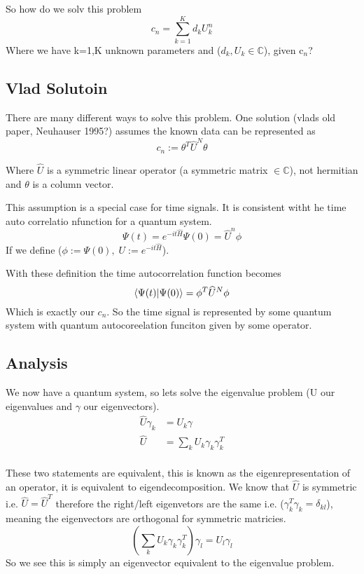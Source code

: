 \documentclass{article}
\newcommand{\be}{\begin{equation}}
\newcommand{\ee}{\end{equation}}
\begin{document}
So how do we solv this problem
\be
c_n = \sum_{k=1}^K d_kU_k^n
\ee
Where we have k=1,K unknown parameters and ($d_k,U_k \in \mathbb{C}$), given c$_n$?

\subsection{Vlad Solutoin}
There are many different ways to solve this problem.
One solution (vlads old paper, Neuhauser 1995?) assumes the known data can be represented as
\be
c_n := \theta^T\widehat{U}^N\theta
\ee

Where $\widehat{U}$ is a symmetric linear operator (a symmetric matrix $\in \mathbb{C}$), not hermitian and $\theta$ is a column vector.

This assumption is a special case for time signals.
It is consistent witht he time auto correlatio nfunction for a quantum system.
\be
\Psi(t) = e^{-it\widehat{H}} \Psi(0) = \widehat{U}^n\phi
\ee
If we define ($\phi:= \Psi(0), \; U:= e^{-it\widehat{H}}$).

With these definition the time autocorrelation function becomes
\be
\braket{\Psi(t)|\Psi(0)} = \phi^T\widehat{U}^N\phi
\ee
Which is exactly our $c_n$.
So the time signal is represented by some quantum system with quantum autocoreelation funciton given by some operator.

\subsection{Analysis}
We now have a quantum system, so lets solve the eigenvalue problem (U our eigenvalues and $\gamma$ our eigenvectors).
\be
\begin{split}
    \widehat{U}\gamma_k&=U_k\gamma\\
    \widehat{U}&=\sum_kU_k\gamma_k\gamma_k^T\\
\end{split}
\ee

These two statements are equivalent, this is known as the eigenrepresentation of an operator, it is equivalent to eigendecomposition.
We know that $\widehat{U}$ is symmetric i.e. $\widehat{U}=\widehat{U}^T$ therefore the right/left eigenvetors are the same i.e. ($\gamma_k^T\gamma_k=\delta_{kl}$), meaning the eigenvectors are orthogonal for symmetric matricies.
\be
\left( \sum_k U_k\gamma_k\gamma_k^T \right) \gamma_l = U_l\gamma_l
\ee
So we see this is simply an eigenvector equivalent to the eigenvalue problem.
\end{document}
